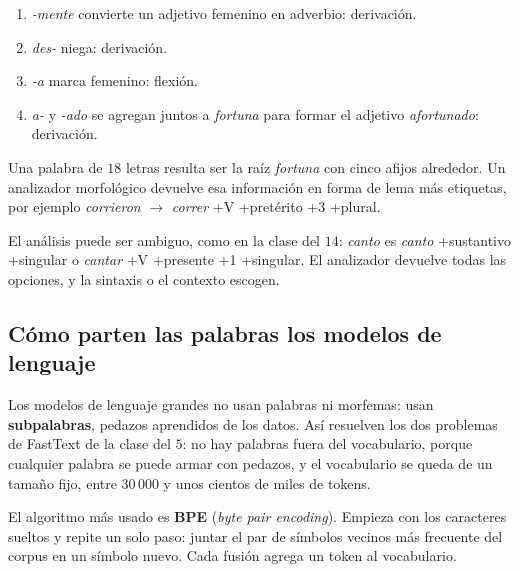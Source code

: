 \documentclass[11pt,letterpaper]{article}
\begin{document}
\begin{enumerate}[itemsep=0.3em]
    \item \textit{-mente} convierte un adjetivo femenino en adverbio:
          derivación.
    \item \textit{des-} niega: derivación.
    \item \textit{-a} marca femenino: flexión.
    \item \textit{a-} y \textit{-ado} se agregan juntos a
          \textit{fortuna} para formar el adjetivo
          \textit{afortunado}: derivación.
\end{enumerate}

Una palabra de $18$ letras resulta ser la raíz \textit{fortuna} con
cinco afijos alrededor. Un analizador morfológico devuelve esa
información en forma de lema más etiquetas, por ejemplo
\textit{corrieron} $\to$ \textit{correr} +V +pretérito +3 +plural.

\begin{ojo}
    El análisis puede ser ambiguo, como en la clase del $14$:
    \textit{canto} es \textit{canto} +sustantivo +singular o
    \textit{cantar} +V +presente +1 +singular. El analizador devuelve
    todas las opciones, y la sintaxis o el contexto escogen.
\end{ojo}


\subsection*{Cómo parten las palabras los modelos de lenguaje}

Los modelos de lenguaje grandes no usan palabras ni morfemas: usan
\textbf{subpalabras}, pedazos aprendidos de los datos. Así resuelven
los dos problemas de FastText de la clase del $5$: no hay palabras
fuera del vocabulario, porque cualquier palabra se puede armar con
pedazos, y el vocabulario se queda de un tamaño fijo, entre $30\,000$ y
unos cientos de miles de tokens.

El algoritmo más usado es \textbf{BPE} (\textit{byte pair
encoding}). Empieza con los caracteres sueltos y repite un solo paso:
juntar el par de símbolos vecinos más frecuente del corpus en un
símbolo nuevo. Cada fusión agrega un token al vocabulario.
\end{document}
